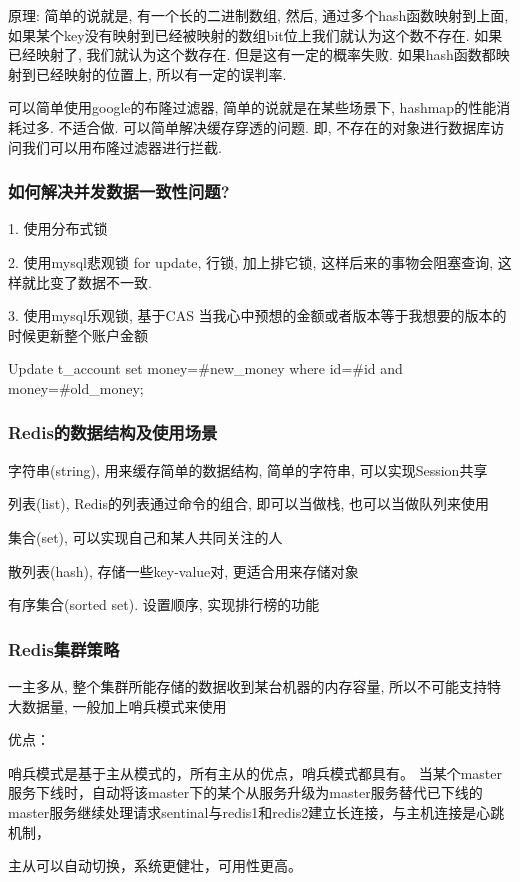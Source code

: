 \documentclass[UTF8]{ctexart}
\begin{document}
原理: 简单的说就是, 有一个长的二进制数组, 然后, 通过多个hash函数映射到上面, 如果某个key没有映射到已经被映射的数组bit位上我们就认为这个数不存在. 如果已经映射了, 我们就认为这个数存在. 但是这有一定的概率失败. 如果hash函数都映射到已经映射的位置上, 所以有一定的误判率.

可以简单使用google的布隆过滤器, 简单的说就是在某些场景下, hashmap的性能消耗过多. 不适合做. 可以简单解决缓存穿透的问题. 即, 不存在的对象进行数据库访问我们可以用布隆过滤器进行拦截.

\subsubsection{如何解决并发数据一致性问题?}
1. 使用分布式锁

2. 使用mysql悲观锁 for update, 行锁, 加上排它锁, 这样后来的事物会阻塞查询, 这样就比变了数据不一致.

3. 使用mysql乐观锁, 基于CAS 当我心中预想的金额或者版本等于我想要的版本的时候更新整个账户金额

Update t\_account set money=\#{new\_money} where id=\#{id} and money=\#{old\_money};
\subsubsection{Redis的数据结构及使用场景}
字符串(string), 用来缓存简单的数据结构, 简单的字符串, 可以实现Session共享\par
列表(list), Redis的列表通过命令的组合, 即可以当做栈, 也可以当做队列来使用\par
集合(set), 可以实现自己和某人共同关注的人\par
散列表(hash), 存储一些key-value对, 更适合用来存储对象\par
有序集合(sorted set). 设置顺序, 实现排行榜的功能\par
\subsubsection{Redis集群策略}
一主多从, 整个集群所能存储的数据收到某台机器的内存容量, 所以不可能支持特大数据量, 一般加上哨兵模式来使用 \par

优点：

哨兵模式是基于主从模式的，所有主从的优点，哨兵模式都具有。
当某个master服务下线时，自动将该master下的某个从服务升级为master服务替代已下线的master服务继续处理请求sentinal与redis1和redis2建立长连接，与主机连接是心跳机制，

主从可以自动切换，系统更健壮，可用性更高。
\end{document}
